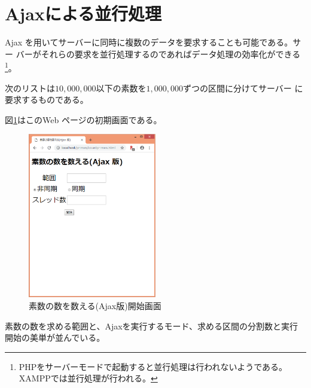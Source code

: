 \section{Ajaxによる並行処理}
Ajax を用いてサーバーに同時に複数のデータを要求することも可能である。サー
バーがそれらの要求を並行処理するのであればデータ処理の効率化ができる
\footnote{PHPをサーバーモードで起動すると並行処理は行われないようである。
XAMPPでは並行処理が行われる。}。
\begin{Exec}\upshape\label{contPrimes}
 次のリストは$10,000,000$以下の素数を$1,000,000$ずつの区間に分けてサーバー
 に要求するものである。

 図\ref{countPrimes-Ajax-start}はこのWeb ページの初期画面である。
 \begin{figure}[ht]
	\begin{center}
	 \includegraphics[width=0.5\textwidth]{primes/countPrimes-start.eps}
	\end{center}
 \caption{素数の数を数える(Ajax版)開始画面}\label{countPrimes-Ajax-start}
 \end{figure}

 素数の数を求める範囲と、Ajaxを実行するモード、求める区間の分割数と実行
 開始の美単が並んでいる。


\end{Exec}
